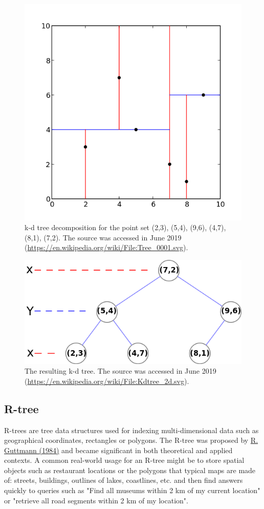 \documentclass[12pt]{article}
\theoremstyle{plain}
\begin{document}
\begin{figure}[h!]
    \centering
	\includegraphics[width=.6\linewidth]{media/Kdtree_2d.png}
	\caption{k-d tree decomposition for the point set (2,3), (5,4), (9,6), (4,7), (8,1), (7,2). The source was accessed in June 2019 (\url{https://en.wikipedia.org/wiki/File:Tree_0001.svg}).}
	\label{kdtree_1}
\end{figure}

\begin{figure}[h!]
    \centering
	\includegraphics[width=.6\linewidth]{media/Tree_0001.png}
	\caption{The resulting k-d tree. The source was accessed in June 2019 (\url{https://en.wikipedia.org/wiki/File:Kdtree_2d.svg}).}
	\label{kdtree_2}
\end{figure}


\pagebreak
\subsection{R-tree}

R-trees are tree data structures used for indexing multi-dimensional data such as geographical coordinates, rectangles or polygons. The R-tree was proposed by \hyperlink{R. Guttmann (1984)}{R. Guttmann (1984)} and became significant in both theoretical and applied contexts. A common real-world usage for an R-tree might be to store spatial objects such as restaurant locations or the polygons that typical maps are made of: streets, buildings, outlines of lakes, coastlines, etc. and then find answers quickly to queries such as "Find all museums within 2 km of my current location" or "retrieve all road segments within 2 km of my location".
\end{document}

